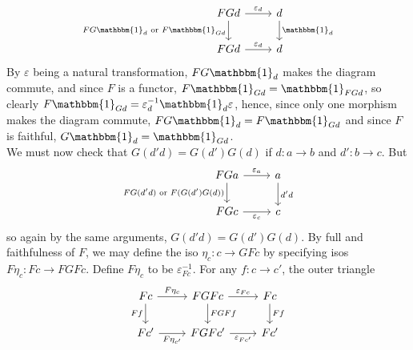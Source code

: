 \documentclass[a4paper]{article}
\theoremstyle{plain}%
\theoremstyle{definition}
\theoremstyle{remark}
\begin{document}
\begin{equation*}
\begin{tikzcd}
    FG d \ar[r, "\varepsilon_d"] \ar[d, "
    FG \mathbbm{1}_d \text{ or } F \mathbbm{1}_{Gd}"'] & d \ar[d, "\mathbbm{1}_d"]\\
    FG d \ar[r, "\varepsilon_d"] & d
\end{tikzcd}
\end{equation*}
By $\varepsilon$ being a natural transformation, $FG \mathbbm{1}_d$ makes the
diagram commute, and since $F$ is a functor, 
$F \mathbbm{1}_{Gd} = \mathbbm{1}_{FG d}$, so
clearly $F \mathbbm{1}_{Gd} = \varepsilon_d^{-1} \mathbbm{1}_d \varepsilon$,
hence, since only one morphism makes the diagram commute,
 $FG \mathbbm{1}_d = F \mathbbm{1}_{Gd}$ and since
 $F$ is faithful, $G \mathbbm{1}_d = \mathbbm{1}_{Gd}$.\\
 \linebreak
We must now check that $G \left( d' d \right) 
= G(d') G(d)$ if $d  \colon a \to b$ and $d'  \colon b \to c$. But
\begin{equation*}
\begin{tikzcd}
    FG a \ar[d, "FG(d'd) \text{ or } F(G(d') G(d))"'] \ar[r, "\varepsilon_a"]
    & a \ar[d, "d'd"] \\
    FG c \ar[r, "\varepsilon_{c}"'] & c
\end{tikzcd}
\end{equation*}
so again by the same arguments, $G(d'd) = G(d') G(d)$. 
By full and faithfulness of  $F$, we may define the iso $\eta_{c} 
 \colon c \to GF c$ by specifying
 isos $F \eta_c  \colon Fc \to FGFc$. Define
 $F \eta_c$ to be $\varepsilon_{Fc}^{-1}$. For any $f  \colon c \to c'$, the
 outer triangle
 \begin{equation*}
 \begin{tikzcd}
     Fc \ar[d, "Ff"'] \ar[r, "F \eta_c"] & FGFc \ar[d, "FGF f"] \ar[r,
     "\varepsilon_{Fc}"] & Fc \ar[d, "Ff"] \\
     Fc' \ar[r, "F \eta_{c'}"'] & FGFc' \ar[r, "\varepsilon_{Fc'}"'] & Fc'
 \end{tikzcd}
 \end{equation*}
 
\end{document}
